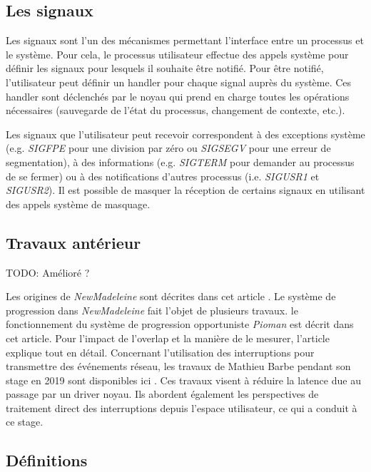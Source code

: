 \subsection{Les signaux}
\label{sec:signal}

Les signaux sont l'un des mécanismes permettant l'interface entre un processus et le système.
Pour cela, le processus utilisateur effectue des appels système pour définir les signaux pour lesquels il souhaite être notifié.
Pour être notifié, l'utilisateur peut définir un handler pour chaque signal auprès du système.
Ces handler sont déclenchés par le noyau qui prend en charge toutes les opérations nécessaires (sauvegarde de l'état du processus, changement de contexte, etc.).

Les signaux que l'utilisateur peut recevoir correspondent à des exceptions système (e.g. \emph{SIGFPE} pour une division par zéro ou \emph{SIGSEGV} pour une erreur de segmentation),
à des informations (e.g. \emph{SIGTERM} pour demander au processus de se fermer) ou à des notifications d'autres processus (i.e. \emph{SIGUSR1} et \emph{SIGUSR2}).
Il est possible de masquer la réception de certains signaux en utilisant des appels système de masquage.

\subsection{Travaux antérieur}

TODO: Amélioré ?

Les origines de \emph{NewMadeleine} sont décrites dans cet article \cite{aumage:inria-00127356}.
Le système de progression dans \emph{NewMadeleine} fait l'objet de plusieurs travaux.
le fonctionnement du système de progression opportuniste \emph{Pioman} est décrit dans cet article\cite{denis:hal-01087775}.
Pour l'impact de l'overlap et la manière de le mesurer, l'article \cite{denis:hal-01324179} explique tout en détail.
Concernant l'utilisation des interruptions pour transmettre des événements réseau, les travaux de Mathieu Barbe pendant son stage en 2019 sont disponibles ici \cite{internshipMathieu}.
Ces travaux visent à réduire la latence due au passage par un driver noyau.
Ils abordent également les perspectives de traitement direct des interruptions depuis l'espace utilisateur, ce qui a conduit à ce stage.


\subsection{Définitions} %


